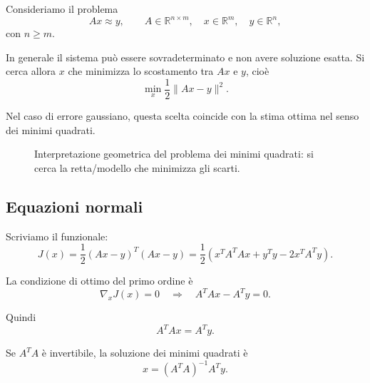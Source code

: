 Consideriamo il problema
\[
Ax \approx y,
\qquad
A\in\mathbb{R}^{n\times m},
\quad
x\in\mathbb{R}^m,
\quad
y\in\mathbb{R}^n,
\]
con \(n\ge m\).

In generale il sistema può essere sovradeterminato e non avere soluzione esatta. Si cerca allora \(x\) che minimizza lo scostamento tra \(Ax\) e \(y\), cioè
\[
\min_x \frac12\|Ax-y\|^2.
\]

Nel caso di errore gaussiano, questa scelta coincide con la stima ottima nel senso dei minimi quadrati.

\begin{figure}[h!]
\centering
{}
\caption{Interpretazione geometrica del problema dei minimi quadrati: si cerca la retta/modello che minimizza gli scarti.}
\end{figure}

\subsection{Equazioni normali}

Scriviamo il funzionale:
\[
J(x)=\frac12(Ax-y)^T(Ax-y)
=\frac12\left(x^TA^TAx+y^Ty-2x^TA^Ty\right).
\]

La condizione di ottimo del primo ordine è
\[
\nabla_x J(x)=0
\quad\Longrightarrow\quad
A^TAx-A^Ty=0.
\]

Quindi
\[
\boxed{
A^TAx=A^Ty.
}
\]

Se \(A^TA\) è invertibile, la soluzione dei minimi quadrati è
\[
\boxed{
x=(A^TA)^{-1}A^Ty.
}
\]

